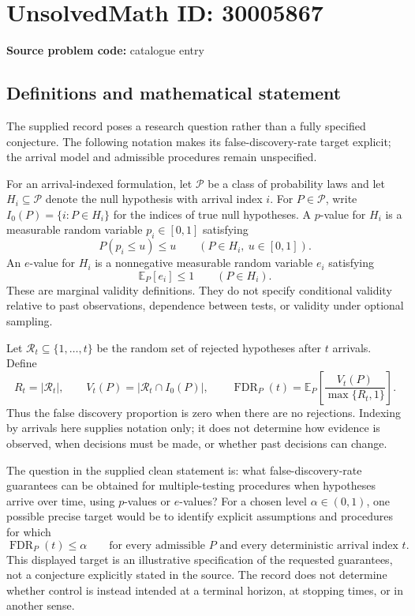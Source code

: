 \documentclass[11pt]{article}
\begin{document}
\section*{UnsolvedMath ID: 30005867}
\textbf{Source problem code:} catalogue entry
\subsection{Definitions and mathematical statement}
The supplied record poses a research question rather than a fully specified conjecture. The following notation makes its false-discovery-rate target explicit; the arrival model and admissible procedures remain unspecified.

For an arrival-indexed formulation, let \(\mathcal P\) be a class of probability laws and let \(H_i\subseteq\mathcal P\) denote the null hypothesis with arrival index \(i\). For \(P\in\mathcal P\), write \(I_0(P)=\{i:P\in H_i\}\) for the indices of true null hypotheses. A \(p\)-value for \(H_i\) is a measurable random variable \(p_i\in[0,1]\) satisfying
\[
 P(p_i\le u)\le u\qquad(P\in H_i,\ u\in[0,1]).
\]
An \(e\)-value for \(H_i\) is a nonnegative measurable random variable \(e_i\) satisfying
\[
 \mathbb E_P[e_i]\le 1\qquad(P\in H_i).
\]
These are marginal validity definitions. They do not specify conditional validity relative to past observations, dependence between tests, or validity under optional sampling.

Let \(\mathcal R_t\subseteq\{1,\ldots,t\}\) be the random set of rejected hypotheses after \(t\) arrivals. Define
\[
 R_t=|\mathcal R_t|,\qquad V_t(P)=|\mathcal R_t\cap I_0(P)|,
 \qquad \operatorname{FDR}_P(t)=\mathbb E_P\!\left[\frac{V_t(P)}{\max\{R_t,1\}}\right].
\]
Thus the false discovery proportion is zero when there are no rejections. Indexing by arrivals here supplies notation only; it does not determine how evidence is observed, when decisions must be made, or whether past decisions can change.

The question in the supplied clean statement is: what false-discovery-rate guarantees can be obtained for multiple-testing procedures when hypotheses arrive over time, using \(p\)-values or \(e\)-values? For a chosen level \(\alpha\in(0,1)\), one possible precise target would be to identify explicit assumptions and procedures for which
\[
 \operatorname{FDR}_P(t)\le\alpha
 \qquad\text{for every admissible }P\text{ and every deterministic arrival index }t.
\]
This displayed target is an illustrative specification of the requested guarantees, not a conjecture explicitly stated in the source. The record does not determine whether control is instead intended at a terminal horizon, at stopping times, or in another sense.
\end{document}
